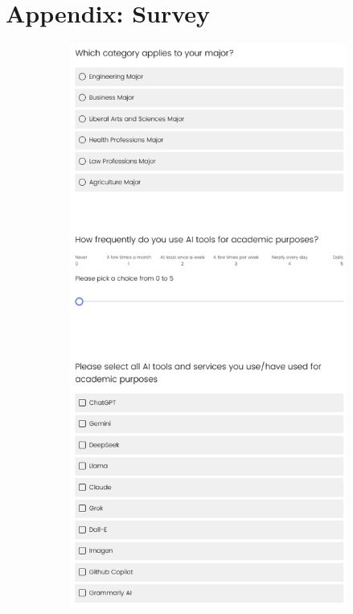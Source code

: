 \documentclass[12pt]{article}
\begin{document}
\section{Appendix: Survey}
\begin{figure}[H]
  \centering
  \begin{subfigure}[b]{0.49\textwidth}
    \includegraphics[width=\textwidth]{s1.png} %

\end{subfigure}
\end{figure}
\end{document}
